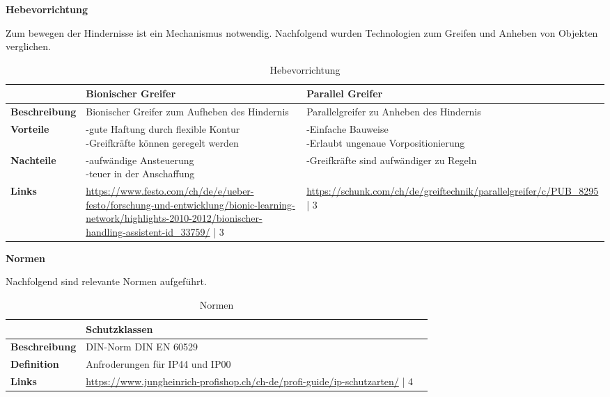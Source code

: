 \textbf{Hebevorrichtung}

Zum bewegen der Hindernisse ist ein Mechanismus notwendig. Nachfolgend wurden Technologien zum Greifen und Anheben von Objekten verglichen.

\begin{table}[H]
\centering
\small
\begin{tabularx}{\textwidth}{|l|X|X|}
\hline
\textbf{} & \textbf{Bionischer Greifer}&\textbf{Parallel Greifer}\\
  \hline
  \textbf{Beschreibung} & Bionischer Greifer zum Aufheben des Hindernis&   Parallelgreifer zu Anheben des Hindernis  \\
  \hline
  \textbf{Vorteile} & \makecell{-gute Haftung durch flexible Kontur \\-Greifkräfte können geregelt werden}&\makecell{-Einfache Bauweise\\ -Erlaubt ungenaue Vorpositionierung}  \\
  \hline
  \textbf{Nachteile}& \makecell{-aufwändige Ansteuerung \\ -teuer in der Anschaffung} &\makecell{-Greifkräfte sind aufwändiger zu Regeln \\ }     \\
  \hline
  \textbf{Links}  &   \url{https://www.festo.com/ch/de/e/ueber-festo/forschung-und-entwicklung/bionic-learning-network/highlights-2010-2012/bionischer-handling-assistent-id_33759/} | 3      &  \url{https://schunk.com/ch/de/greiftechnik/parallelgreifer/c/PUB_8295} | 3 \\
  \hline
\end{tabularx}
\caption{Hebevorrichtung}
\label{table:lifting-components}
\end{table}



\textbf{Normen}

Nachfolgend sind relevante Normen aufgeführt.

\begin{table}[H]
\centering
\small
\begin{tabularx}{\textwidth}{|l|X|X|}
\hline
\textbf{} & \textbf{Schutzklassen} & \textbf{}\\
  \hline
  \textbf{Beschreibung}&     DIN-Norm DIN EN 60529       &           \\
  \hline
  \textbf{Definition}&       Anfroderungen für IP44 und IP00      &           \\
  \hline
  \textbf{Links}&    \url{https://www.jungheinrich-profishop.ch/ch-de/profi-guide/ip-schutzarten/} | 4      &               \\
  \hline
\end{tabularx}
\caption{Normen}
\label{table:norms}
\end{table}



